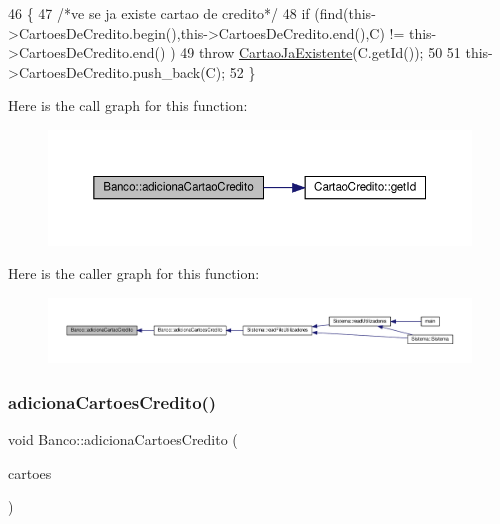 \begin{DoxyCode}
46 \{
47     \textcolor{comment}{/*ve se ja existe cartao de credito*/}
48     \textcolor{keywordflow}{if} (find(this->CartoesDeCredito.begin(),this->CartoesDeCredito.end(),C) != this->CartoesDeCredito.end()
      )
49         \textcolor{keywordflow}{throw} \hyperlink{classCartaoJaExistente}{CartaoJaExistente}(C.getId());
50 
51     this->CartoesDeCredito.push\_back(C);
52 \}
\end{DoxyCode}
Here is the call graph for this function\+:
\nopagebreak
\begin{figure}[H]
\begin{center}
\leavevmode
\includegraphics[width=350pt]{classBanco_a2ac1bb3c6a742743bcbb6dd0a312d74d_cgraph}
\end{center}
\end{figure}
Here is the caller graph for this function\+:
\nopagebreak
\begin{figure}[H]
\begin{center}
\leavevmode
\includegraphics[width=350pt]{classBanco_a2ac1bb3c6a742743bcbb6dd0a312d74d_icgraph}
\end{center}
\end{figure}
\mbox{\label{classBanco_a5f36ab07909fc570d158a21e2e6398f5}} 
\subsubsection{\texorpdfstring{adiciona\+Cartoes\+Credito()}{adicionaCartoesCredito()}}
{\footnotesize\ttfamily void Banco\+::adiciona\+Cartoes\+Credito (\begin{DoxyParamCaption}\item[{const std\+::vector$<$ \hyperlink{classCartaoCredito}{Cartao\+Credito} $>$ \&}]{cartoes }\end{DoxyParamCaption})}



